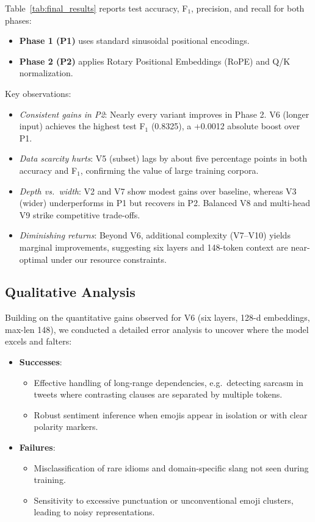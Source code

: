 \documentclass[twocolumn,superscriptaddress,aps]{revtex4-1}
\begin{document}
Table~\ref{tab:final_results} reports test accuracy, F$_1$, precision, and recall for both phases:
\begin{itemize}
  \item \textbf{Phase 1 (P1)} uses standard sinusoidal positional encodings.
  \item \textbf{Phase 2 (P2)} applies Rotary Positional Embeddings (RoPE) and Q/K normalization.
\end{itemize}

Key observations:
\begin{itemize}
  \item \emph{Consistent gains in P2}: Nearly every variant improves in Phase 2. V6 (longer input) achieves the highest test F$_1$ (0.8325), a +0.0012 absolute boost over P1.
  \item \emph{Data scarcity hurts}: V5 (subset) lags by about five percentage points in both accuracy and F$_1$, confirming the value of large training corpora.
  \item \emph{Depth vs.\ width}: V2 and V7 show modest gains over baseline, whereas V3 (wider) underperforms in P1 but recovers in P2. Balanced V8 and multi-head V9 strike competitive trade-offs.
  \item \emph{Diminishing returns}: Beyond V6, additional complexity (V7–V10) yields marginal improvements, suggesting six layers and 148-token context are near-optimal under our resource constraints.
\end{itemize}

\subsection{Qualitative Analysis}

Building on the quantitative gains observed for V6 (six layers, 128-d embeddings, max-len 148), we conducted a detailed error analysis to uncover where the model excels and falters:

\begin{itemize}
  \item \textbf{Successes}:  
    \begin{itemize}
      \item Effective handling of long-range dependencies, e.g.\ detecting sarcasm in tweets where contrasting clauses are separated by multiple tokens.
      \item Robust sentiment inference when emojis appear in isolation or with clear polarity markers.
    \end{itemize}
  \item \textbf{Failures}:  
    \begin{itemize}
      \item Misclassification of rare idioms and domain-specific slang not seen during training.
      \item Sensitivity to excessive punctuation or unconventional emoji clusters, leading to noisy representations.
    \end{itemize}
\end{itemize}
\end{document}
